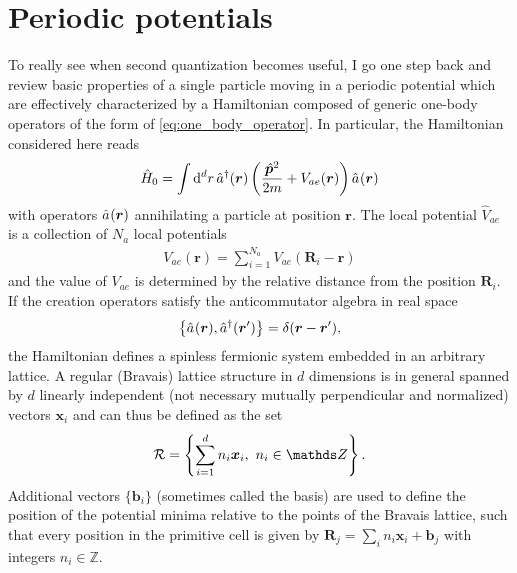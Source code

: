 \section{Periodic potentials}
\label{sec:periodic_potentials}
To really see when second quantization becomes useful, I go one step back and review basic properties of a single particle moving in a periodic potential which are effectively characterized by a Hamiltonian composed of generic one-body operators of the form of \cref{eq:one_body_operator}.
In particular, the Hamiltonian considered here reads
\begin{align}
    \hat H_0 = \int\rd^d r\, \hat a^\dag({\bm r})\brlr{\frac{\hat{\bm p}^2}{2m}+V_{ae}({\bm r})}\hat a^\pdag({\bm r})
\end{align}
with operators $\hat a^\pdag({\bm r})$ annihilating a particle at position $\bm r$.
The local potential $\hat V_{ae}$ is a collection of $N_a$ local potentials
\begin{align}
    V_{ae}({\bm r}) = \sum_{i=1}^{N_a}V_{ae}({\bm R}_i - {\bm r})
\end{align}
and the value of $V_{ae}$ is determined by the relative distance from the position ${\bm R}_i$.
If the creation operators satisfy the anticommutator algebra in real space
\begin{align}
    \anticommutator{\hat a^\pdag({\bm r}),\hat a^\dag({\bm r'})}=\delta({\bm r}-{\bm r'}),
\end{align}
the Hamiltonian defines a spinless fermionic system embedded in an arbitrary lattice.
A regular (Bravais) lattice structure in $d$ dimensions is in general spanned by $d$ linearly independent (not necessary mutually perpendicular and normalized) vectors ${\bm x}_i$ and can thus be defined as the set
\begin{align}
    \mathcal{R} = \anticommutator{\sum_{i=1}^d n_i {\bm x}_i,\ n_i\in\mathds Z}.
\end{align}
Additional vectors $\{{\bm b}_i\}$ (sometimes called the basis) are used to define the position of the potential minima relative to the points of the Bravais lattice, such that every position in the primitive cell is given by ${\bm R}_j = \sum_i n_i {\bm x}_i + {\bm b}_j$ with integers $n_i\in\mathds Z$.
